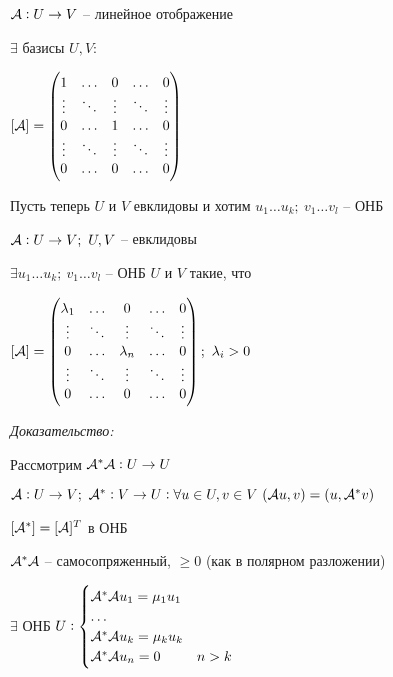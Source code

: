 \documentclass[12pt]{article}
\begin{document}
\begin{nota}{}
    $\mathcal{A} : U \to V$ -- линейное отображение 

    \begin{Reminder}{}
        $\exists$ базисы $U, V :$

        $[\mathcal{A}] = \begin{pmatrix}
            1 & \ldots & 0 & \ldots & 0 \\
            \vdots & \ddots & \vdots & \ddots & \vdots \\
            0 & \ldots & 1 & \ldots & 0 \\
            \vdots & \ddots & \vdots & \ddots & \vdots \\
            0 & \ldots & 0 & \ldots & 0
        \end{pmatrix}$
    \end{Reminder}

    Пусть теперь $U$ и $V$ евклидовы и хотим $u_1 \ldots u_k;\ v_1 \ldots v_l$ -- ОНБ
\end{nota}

\begin{theo}{}
    $\mathcal{A} : U \to V;\ U, V$ -- евклидовы 

    $\exists u_1 \ldots u_k;\ v_1 \ldots v_l$ -- ОНБ $U$ и $V$ такие, что 

    $[\mathcal{A}] = \begin{pmatrix}
        \lambda_1 & \ldots & 0 & \ldots & 0 \\
        \vdots & \ddots & \vdots & \ddots & \vdots \\
        0 & \ldots & \lambda_n & \ldots & 0 \\
        \vdots & \ddots & \vdots & \ddots & \vdots \\
        0 & \ldots & 0 & \ldots & 0
    \end{pmatrix};\ \lambda_i > 0$
\end{theo}

\textit{Доказательство:}

Рассмотрим $\mathcal{A}^*\mathcal{A} : U \to U$

\begin{Reminder}{}
    $\mathcal{A} : U \to V;\ \mathcal{A}^* : V \to U : \forall u \in U, v \in V\ (\mathcal{A} u, v) = (u, \mathcal{A}^* v)$

    $[\mathcal{A}^*] = [\mathcal{A}]^T$ в ОНБ
\end{Reminder}

$\mathcal{A}^*\mathcal{A}$ -- самосопряженный, $\geq 0$ (как в полярном разложении)

$\exists$ ОНБ $U : \begin{cases}
    \mathcal{A}^*\mathcal{A} u_1 = \mu_1 u_1 \\
    \ldots \\
    \mathcal{A}^*\mathcal{A} u_k = \mu_k u_k \\
    \mathcal{A}^*\mathcal{A} u_n = 0 & n > k 
\end{cases}$
\end{document}
